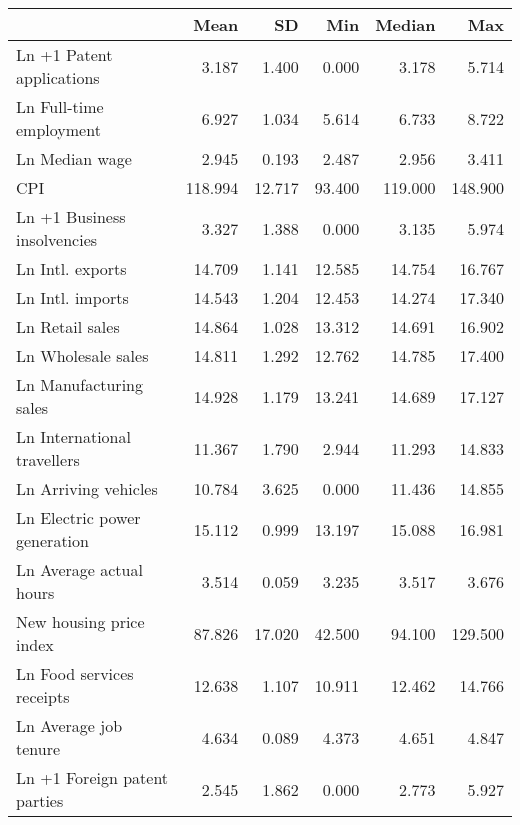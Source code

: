 
\begin{tabular}[t]{lrrrrr}
\toprule
  & Mean & SD & Min & Median & Max\\
\midrule
Ln +1 Patent applications & \num{3.187} & \num{1.400} & \num{0.000} & \num{3.178} & \num{5.714}\\
Ln Full-time employment & \num{6.927} & \num{1.034} & \num{5.614} & \num{6.733} & \num{8.722}\\
Ln Median wage & \num{2.945} & \num{0.193} & \num{2.487} & \num{2.956} & \num{3.411}\\
CPI & \num{118.994} & \num{12.717} & \num{93.400} & \num{119.000} & \num{148.900}\\
Ln +1 Business insolvencies & \num{3.327} & \num{1.388} & \num{0.000} & \num{3.135} & \num{5.974}\\
Ln Intl. exports & \num{14.709} & \num{1.141} & \num{12.585} & \num{14.754} & \num{16.767}\\
Ln Intl. imports & \num{14.543} & \num{1.204} & \num{12.453} & \num{14.274} & \num{17.340}\\
Ln Retail sales & \num{14.864} & \num{1.028} & \num{13.312} & \num{14.691} & \num{16.902}\\
Ln Wholesale sales & \num{14.811} & \num{1.292} & \num{12.762} & \num{14.785} & \num{17.400}\\
Ln Manufacturing sales & \num{14.928} & \num{1.179} & \num{13.241} & \num{14.689} & \num{17.127}\\
Ln International travellers & \num{11.367} & \num{1.790} & \num{2.944} & \num{11.293} & \num{14.833}\\
Ln Arriving vehicles & \num{10.784} & \num{3.625} & \num{0.000} & \num{11.436} & \num{14.855}\\
Ln Electric power generation & \num{15.112} & \num{0.999} & \num{13.197} & \num{15.088} & \num{16.981}\\
Ln Average actual hours & \num{3.514} & \num{0.059} & \num{3.235} & \num{3.517} & \num{3.676}\\
New housing price index & \num{87.826} & \num{17.020} & \num{42.500} & \num{94.100} & \num{129.500}\\
Ln Food services receipts & \num{12.638} & \num{1.107} & \num{10.911} & \num{12.462} & \num{14.766}\\
Ln Average job tenure & \num{4.634} & \num{0.089} & \num{4.373} & \num{4.651} & \num{4.847}\\
Ln +1 Foreign patent parties & \num{2.545} & \num{1.862} & \num{0.000} & \num{2.773} & \num{5.927}\\
\bottomrule
\end{tabular}
